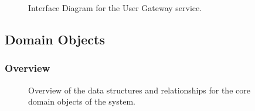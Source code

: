 \documentclass[12pt]{article}
\begin{document}
\begin{figure}[H]
\centering	
{}
\caption{Interface Diagram for the User Gateway service.}
\end{figure}


\vspace{0.2in}
\newpage
\subsection{Domain Objects}
\subsubsection{Overview}

\begin{figure}[H]
\centering	
{}
\caption{Overview of the data structures and relationships for the core domain objects of the
system.}
\end{figure}
\end{document}
